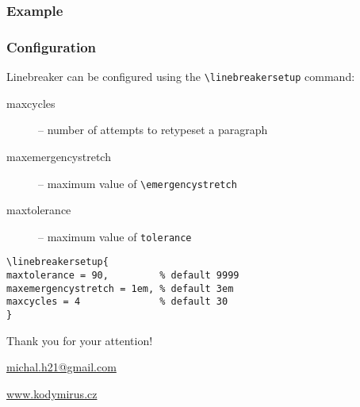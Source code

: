 \begin{frame}
  \frametitle{Example}
\end{frame}

\begin{frame}[fragile]
  \frametitle{Configuration}
  Linebreaker can be configured using the \verb|\linebreakersetup| command:
  \begin{description}
    \item[maxcycles] -- number of attempts to retypeset a paragraph
    \item[maxemergencystretch] -- maximum value of \verb|\emergencystretch|
    \item[maxtolerance]  -- maximum value of \verb|tolerance|
  \end{description}
\begin{verbatim}
\linebreakersetup{
maxtolerance = 90,         % default 9999
maxemergencystretch = 1em, % default 3em
maxcycles = 4              % default 30
}
\end{verbatim}

\end{frame}


\begin{frame}[standout]
  Thank you for your attention!

  \url{michal.h21@gmail.com}

  \url{www.kodymirus.cz}
\end{frame}


